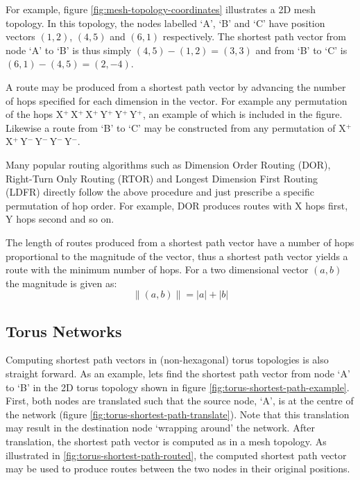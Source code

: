 			For example, figure \ref{fig:mesh-topology-coordinates} illustrates a 2D
			mesh topology. In this topology, the nodes labelled `A', `B' and `C' have
			position vectors $(1, 2)$, $(4, 5)$ and $(6, 1)$ respectively. The
			shortest path vector from node `A' to `B' is thus simply $(4, 5) - (1, 2)
			= (3, 3)$ and from `B' to `C' is $(6, 1) - (4, 5) = (2, -4)$.
			
			A route may be produced from a shortest path vector by advancing the
			number of hops specified for each dimension in the vector. For example
			any permutation of the hops X$^+\,$X$^+\,$X$^+\,$Y$^+\,$Y$^+\,$Y$^+$, an
			example of which is included in the figure. Likewise a route from `B' to
			`C' may be constructed from any permutation of
			X$^+\,$X$^+\,$Y$^-\,$Y$^-\,$Y$^-\,$Y$^-$.
			
			Many popular routing algorithms such as Dimension Order Routing (DOR),
			Right-Turn Only Routing (RTOR) and Longest Dimension First Routing (LDFR)
			\cite{dally04,davies12} directly follow the above procedure and just
			prescribe a specific permutation of hop order. For example, DOR produces
			routes with X hops first, Y hops second and so on.
			
			The length of routes produced from a shortest path vector have a number
			of hops proportional to the magnitude of the vector, thus a shortest path
			vector yields a route with the minimum number of hops. For a two
			dimensional vector $(a, b)$ the magnitude is given as:
			\begin{equation}
				\| (a, b) \| = \lvert a \rvert + \lvert b \rvert
			\end{equation}
		
		\subsection{Torus Networks}
			
			Computing shortest path vectors in (non-hexagonal) torus topologies is
			also straight forward. As an example, lets find the shortest path vector
			from node `A' to `B' in the 2D torus topology shown in figure
			\ref{fig:torus-shortest-path-example}. First, both nodes are translated
			such that the source node, `A', is at the centre of the network (figure
			\ref{fig:torus-shortest-path-translate}). Note that this translation may
			result in the destination node `wrapping around' the network. After
			translation, the shortest path vector is computed as in a mesh topology.
			As illustrated in \ref{fig:torus-shortest-path-routed}, the computed
			shortest path vector may be used to produce routes between the two nodes
			in their original positions.
			
